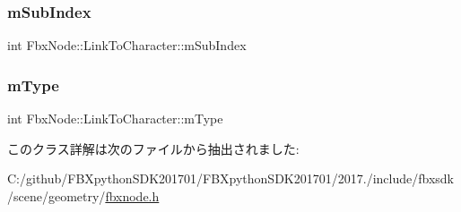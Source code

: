 \subsubsection{\texorpdfstring{m\+Sub\+Index}{mSubIndex}}
{\footnotesize\ttfamily int Fbx\+Node\+::\+Link\+To\+Character\+::m\+Sub\+Index}

\mbox{\label{class_fbx_node_1_1_link_to_character_a2f4f7682807d446a976ec780312043ef}} 
\subsubsection{\texorpdfstring{m\+Type}{mType}}
{\footnotesize\ttfamily int Fbx\+Node\+::\+Link\+To\+Character\+::m\+Type}



このクラス詳解は次のファイルから抽出されました\+:\begin{DoxyCompactItemize}
\item 
C\+:/github/\+F\+B\+Xpython\+S\+D\+K201701/\+F\+B\+Xpython\+S\+D\+K201701/2017./include/fbxsdk/scene/geometry/\hyperlink{fbxnode_8h}{fbxnode.\+h}\end{DoxyCompactItemize}
